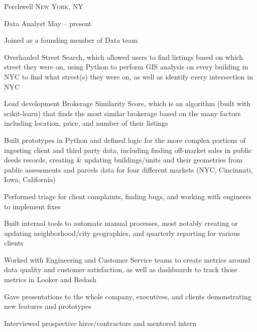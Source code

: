 \documentclass[10pt,a4paper]{article}
\begin{document}
\spacedhrule{0em}{-0.4em}


\headedsection
  {{Perchwell}}
  {\textsc{New York, NY}} {%
  \headedsubsection
    {Data Analyst}
    {May  -- present}
    {\begin{list}{--}
      \item Joined as a founding member of Data team
      \item Overhauled Street Search, which allowed users to find listings based on which street they were on, using Python to perform GIS analysis on every building in NYC to find what street(s) they were on, as well as identify every intersection in NYC
      \item Lead development Brokerage Similarity Score, which is an algorithm (built with scikit-learn) that finds the most similar brokerage based on the many factors including location, price, and number of their listings
      \item Built prototypes in Python and defined logic for the more complex portions of ingesting client and third party data, including finding off-market sales in public deeds records, creating \& updating buildings/units and their geometries from public assessments and parcels data for four different markets (NYC, Cincinnati, Iowa, California)
      \item Performed triage for client complaints, finding bugs, and working with engineers to implement fixes
      \item Built internal tools to automate manual processes, most notably creating or updating neighborhood/city geographies, and quarterly reporting for various clients
      \item Worked with Engineering and Customer Service teams to create metrics around data quality and customer satisfaction, as well as dashboards to track those metrics in Looker and Redash
      \item Gave presentations to the whole company, executives, and clients demonstrating new features and prototypes
      \item Interviewed prospective hires/contractors and mentored intern
    \end{list}}
}
\end{document}
